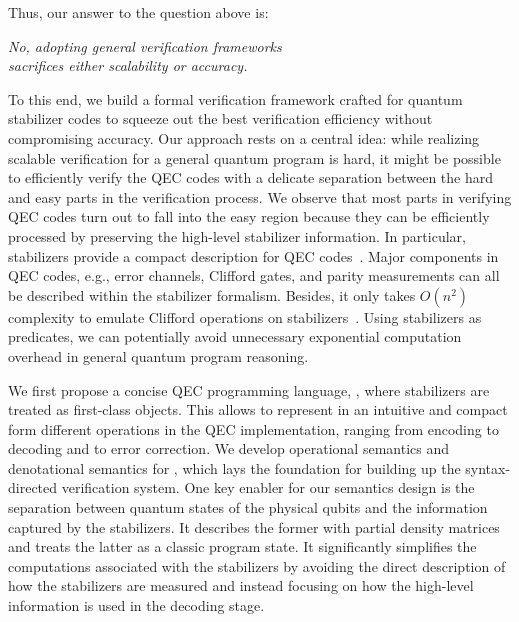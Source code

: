 Thus, our answer to the question above is:

\begin{center}
    \textit{No, adopting general verification frameworks }\\
    \textit{sacrifices either scalability or accuracy. } 
\end{center}
%

To this end, we build a formal verification framework crafted for quantum stabilizer codes to squeeze out the best verification efficiency without compromising accuracy.
Our approach rests on a central idea: while realizing scalable verification for a general quantum program is hard, it might be possible 
to efficiently verify the QEC codes
with a delicate separation between the hard and easy parts in the verification process.    
We observe
that most parts in verifying QEC codes turn out to fall into the easy region 
because they can be efficiently processed by preserving the high-level stabilizer information. 
In particular, stabilizers provide a compact description for QEC codes~\cite{Gottesman1997StabilizerCA}. Major components in QEC codes, e.g., error channels, Clifford gates, and parity measurements can all be described within the stabilizer formalism. Besides, it only takes $O(n^2)$ complexity to emulate Clifford operations on stabilizers~\cite{nielsen2002quantum}. Using stabilizers as predicates, we can potentially avoid unnecessary exponential computation overhead  in general quantum program reasoning. 







We first propose a concise QEC programming language, {\langname}, where stabilizers are treated as first-class objects. 
This allows {\langname} to represent in an intuitive and compact form different operations in the QEC implementation, ranging from encoding to decoding and to error correction.
We develop operational semantics and denotational semantics for {\langname}, which lays the foundation for building up the syntax-directed verification system. 
One key enabler for our semantics design is the separation between quantum states of the physical qubits and the information captured by the stabilizers. 
It describes the former with partial density matrices and treats the latter as a classic program state. 
It significantly simplifies the computations associated with the stabilizers by avoiding the direct description of how the stabilizers are measured and instead focusing on how the high-level information is used in the decoding stage.

